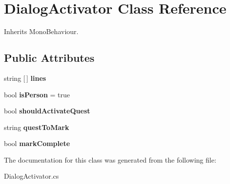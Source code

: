 \hypertarget{class_dialog_activator}{}\section{Dialog\+Activator Class Reference}
\label{class_dialog_activator}


Inherits Mono\+Behaviour.

\subsection*{Public Attributes}
\begin{DoxyCompactItemize}
\item 
\mbox{\label{class_dialog_activator_a99dd62dfd88ed62687c93b7ff268560d}} 
string \mbox{[}$\,$\mbox{]} {\bfseries lines}
\item 
\mbox{\label{class_dialog_activator_a182332962bf1ff9328e8e64e275e95a9}} 
bool {\bfseries is\+Person} = true
\item 
\mbox{\label{class_dialog_activator_af88693bb87b1567b54525e61ceb0c475}} 
bool {\bfseries should\+Activate\+Quest}
\item 
\mbox{\label{class_dialog_activator_acf42dc5103e33737700812a15df2827b}} 
string {\bfseries quest\+To\+Mark}
\item 
\mbox{\label{class_dialog_activator_a95a67d5adbc56e97bdebcb483722898c}} 
bool {\bfseries mark\+Complete}
\end{DoxyCompactItemize}


The documentation for this class was generated from the following file\+:\begin{DoxyCompactItemize}
\item 
Dialog\+Activator.\+cs\end{DoxyCompactItemize}
